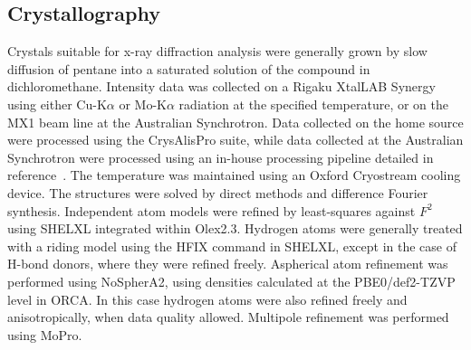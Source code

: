 \begin{refsection}
\subsection{Crystallography}
Crystals suitable for x-ray diffraction analysis were generally grown by slow diffusion of pentane into a saturated solution of the compound in dichloromethane.
Intensity data was collected on a Rigaku XtalLAB Synergy using either Cu-K$\alpha$ or Mo-K$\alpha$ radiation at the specified temperature, or on the MX1 beam line at the Australian Synchrotron\autocite{Cowieson2015}. 
Data collected on the home source were processed using the CrysAlisPro suite, while data collected at the Australian Synchrotron were processed using an in-house processing pipeline detailed in reference~\cite{Cowieson2015}.
The temperature was maintained using an Oxford Cryostream cooling device. 
The structures were solved by direct methods and difference Fourier synthesis.\autocite{Sheldrick2015}
Independent atom models were refined by least-squares against $F^{2}$ using SHELXL integrated within Olex2.3.\autocite{Sheldrick2008,Dolomanov2009}
Hydrogen atoms were generally treated with a riding model using the HFIX command in SHELXL, except in the case of H-bond donors, where they were refined freely.
Aspherical atom refinement was performed using NoSpherA2, using densities calculated at the PBE0/def2-TZVP level in ORCA.\autocite{Kleemiss2021,Neese2012}
In this case hydrogen atoms were also refined freely and anisotropically, when data quality allowed.
Multipole refinement was performed using MoPro.\autocite{Jelsch2005}

\printbibliography[heading=subbibliography]
\end{refsection}

